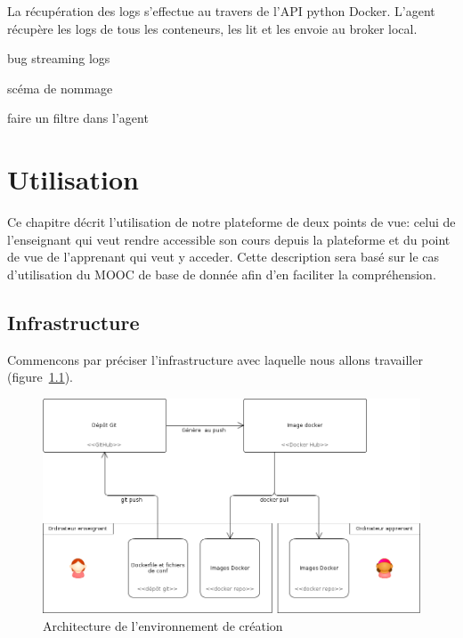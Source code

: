 \documentclass[a4paper,11pt]{report}
\begin{document}
La récupération des logs s'effectue au travers de l'API python Docker\cite{docker-py}.
L'agent récupère les logs de tous les conteneurs, les lit et les envoie au broker local.

bug streaming logs

scéma de nommage


faire un filtre dans l'agent

\pagestyle{fancy}

\chapter{Utilisation}

\pagestyle{fancy}

Ce chapitre décrit l'utilisation de notre plateforme de deux points de vue: celui de l'enseignant qui veut rendre accessible son cours depuis la plateforme et du point de vue de l'apprenant qui veut y acceder.
Cette description sera basé sur le cas d'utilisation du MOOC de base de donnée afin d'en faciliter la compréhension.

\section{Infrastructure}

Commencons par préciser l'infrastructure avec laquelle nous allons travailler (figure~\ref{infrastructure-creation}).

\begin{figure}[!h]
   \caption{\label{infrastructure-creation} Architecture de l'environnement de création}
   \centering
   \includegraphics[width=\textwidth, keepaspectratio=true]{infrastructure-creation.png}
\end{figure}
\end{document}
